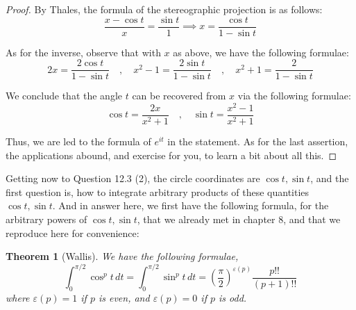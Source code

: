 \documentclass[12pt]{amsbook}
\newtheorem{theorem}{Theorem}[chapter]
\begin{document}
\begin{proof}
By Thales, the formula of the stereographic projection is as follows:
$$\frac{x-\cos t}{x}=\frac{\sin t}{1}\implies x=\frac{\cos t}{1-\sin t}$$

As for the inverse, observe that with $x$ as above, we have the following formulae:
$$2x=\frac{2\cos t}{1-\sin t}\quad,\quad x^2-1=\frac{2\sin t}{1-\sin t}
\quad,\quad x^2+1=\frac{2}{1-\sin t}$$

We conclude that the angle $t$ can be recovered from $x$ via the following formulae:
$$\cos t=\frac{2x}{x^2+1}\quad,\quad\sin t=\frac{x^2-1}{x^2+1}$$

Thus, we are led to the formula of $e^{it}$ in the statement. As for the last assertion, the applications abound, and exercise for you, to learn a bit about all this.
\end{proof}

Getting now to Question 12.3 (2), the circle coordinates are $\cos t,\sin t$, and the first question is, how to integrate arbitrary products of these quantities $\cos t,\sin t$. And in answer here, we first have the following formula, for the arbitrary powers of $\cos t,\sin t$, that we already met in chapter 8, and that we reproduce here for convenience:


\begin{theorem}[Wallis]
We have the following formulae,
$$\int_0^{\pi/2}\cos^pt\,dt=\int_0^{\pi/2}\sin^pt\,dt=\left(\frac{\pi}{2}\right)^{\varepsilon(p)}\frac{p!!}{(p+1)!!}$$
where $\varepsilon(p)=1$ if $p$ is even, and $\varepsilon(p)=0$ if $p$ is odd.
\end{theorem}
\end{document}
